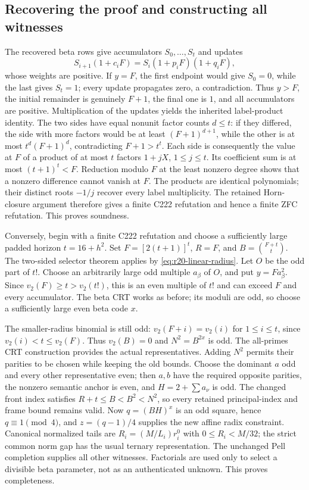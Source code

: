 \subsection{Recovering the proof and constructing all witnesses}
The recovered beta rows give accumulators $S_0,\ldots,S_t$ and updates
\[
 S_{i+1}(1+c_iF)=S_i(1+p_iF)(1+q_iF),
\]
whose weights are positive.  If $y=F$, the first endpoint would give
$S_0=0$, while the last gives $S_t=1$; every update propagates zero,
a contradiction.  Thus $y>F$, the initial remainder is genuinely
$F+1$, the final one is $1$, and all accumulators are positive.
Multiplication of the updates yields the inherited label-product identity.
The two sides have equal nonunit factor counts $d\le t$: if they differed,
the side with more factors would be at least $(F+1)^{d+1}$, while the
other is at most $t^d(F+1)^d$, contradicting $F+1>t^t$.
Each side is consequently the value at $F$ of a product of at most $t$
factors $1+jX$, $1\le j\le t$.  Its coefficient sum is at most
$(t+1)^t<F$.  Reduction modulo $F$ at the least nonzero degree shows
that a nonzero difference cannot vanish at $F$.
The products are identical polynomials; their distinct roots $-1/j$
recover every label multiplicity.  The retained Horn-closure argument
therefore gives a finite C222 refutation and hence a finite ZFC refutation.
This proves soundness.

Conversely, begin with a finite C222 refutation and choose a sufficiently
large padded horizon $t=16+h^2$.  Set $F=[2(t+1)]^t$, $R=F$, and
$B=\binom{F+t}{t}$.  The two-sided selector theorem applies by
\eqref{eq:r20-linear-radius}.
Let $O$ be the odd part of $t!$.  Choose an arbitrarily large odd multiple
$a_\beta$ of $O$, and put $y=F a_\beta^2$.
Since $v_2(F)\ge t>v_2(t!)$, this is an even multiple of $t!$ and can
exceed $F$ and every accumulator.  The beta CRT works as before; its
moduli are odd, so choose a sufficiently large even beta code $x$.

The smaller-radius binomial is still odd:
$v_2(F+i)=v_2(i)$ for $1\le i\le t$, since
$v_2(i)<t\le v_2(F)$.  Thus $v_2(B)=0$ and $N^2=B^{2x}$ is odd.
The all-primes CRT construction provides the actual representatives.
Adding $N^2$ permits their parities to be chosen while keeping the old
bounds.  Choose the dominant $a$ odd and every other representative even;
then $a,b$ have the required opposite parities, the nonzero semantic
anchor is even, and $H=2+\sum a_\nu$ is odd.
The changed front index satisfies $R+t\le B<B^2<N^2$, so every retained
principal-index and frame bound remains valid.
Now $q=(BH)^x$ is an odd square, hence $q\equiv1\pmod4$, and
$z=(q-1)/4$ supplies the new affine radix constraint.
Canonical normalized tails are $R_i=(M/L_i)r_i^0$ with
$0\le R_i<M/32$; the strict common norm gap has the usual ternary
representation.  The unchanged Pell completion supplies all other
witnesses.  Factorials are used only to select a divisible beta parameter,
not as an authenticated unknown.  This proves completeness.

